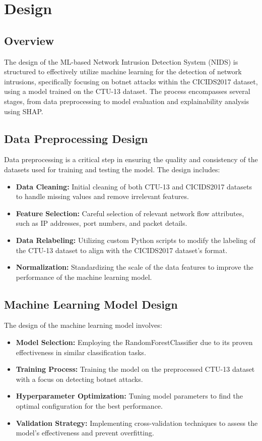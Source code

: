 \chapter{Design}

\section{Overview}
The design of the ML-based Network Intrusion Detection System (NIDS) is structured to effectively utilize machine learning for the detection of network intrusions, specifically focusing on botnet attacks within the CICIDS2017 dataset, using a model trained on the CTU-13 dataset. The process encompasses several stages, from data preprocessing to model evaluation and explainability analysis using SHAP.\@

\section{Data Preprocessing Design}
Data preprocessing is a critical step in ensuring the quality and consistency of the datasets used for training and testing the model. The design includes:

\begin{itemize}
    \item \textbf{Data Cleaning:} Initial cleaning of both CTU-13 and CICIDS2017 datasets to handle missing values and remove irrelevant features.
    \item \textbf{Feature Selection:} Careful selection of relevant network flow attributes, such as IP addresses, port numbers, and packet details.
    \item \textbf{Data Relabeling:} Utilizing custom Python scripts to modify the labeling of the CTU-13 dataset to align with the CICIDS2017 dataset's format.
    \item \textbf{Normalization:} Standardizing the scale of the data features to improve the performance of the machine learning model.
\end{itemize}

\section{Machine Learning Model Design}
The design of the machine learning model involves:

\begin{itemize}
    \item \textbf{Model Selection:} Employing the RandomForestClassifier due to its proven effectiveness in similar classification tasks.
    \item \textbf{Training Process:} Training the model on the preprocessed CTU-13 dataset with a focus on detecting botnet attacks.
    \item \textbf{Hyperparameter Optimization:} Tuning model parameters to find the optimal configuration for the best performance.
    \item \textbf{Validation Strategy:} Implementing cross-validation techniques to assess the model's effectiveness and prevent overfitting.
\end{itemize}

